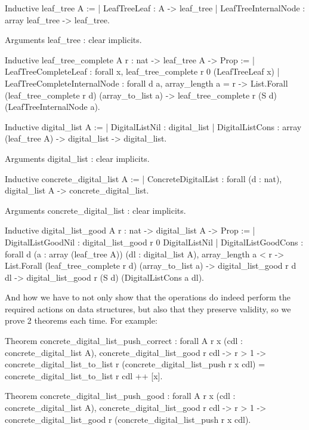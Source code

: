 \documentclass{article}
\begin{document}
\begin{coq}
Inductive leaf_tree {A} :=
  | LeafTreeLeaf : A -> leaf_tree
  | LeafTreeInternalNode : array leaf_tree -> leaf_tree.

Arguments leaf_tree : clear implicits.

Inductive leaf_tree_complete {A} r : nat -> leaf_tree A -> Prop :=
  | LeafTreeCompleteLeaf : forall x, leaf_tree_complete r 0 (LeafTreeLeaf x)
  | LeafTreeCompleteInternalNode :
      forall {d} a,
      array_length a = r ->
      List.Forall (leaf_tree_complete r d) (array_to_list a) ->
      leaf_tree_complete r (S d) (LeafTreeInternalNode a).
\end{coq}
\pagebreak%
\begin{coq}
Inductive digital_list {A} :=
  | DigitalListNil : digital_list
  | DigitalListCons : array (leaf_tree A) -> digital_list -> digital_list.

Arguments digital_list : clear implicits.

Inductive concrete_digital_list {A} :=
  | ConcreteDigitalList : forall (d : nat), digital_list A -> concrete_digital_list.

Arguments concrete_digital_list : clear implicits.

Inductive digital_list_good {A} r : nat -> digital_list A -> Prop :=
  | DigitalListGoodNil : digital_list_good r 0 DigitalListNil
  | DigitalListGoodCons :
      forall {d} (a : array (leaf_tree A)) (dl : digital_list A),
      array_length a < r ->
      List.Forall (leaf_tree_complete r d) (array_to_list a) ->
      digital_list_good r d dl ->
      digital_list_good r (S d) (DigitalListCons a dl).
\end{coq}

And how we have to not only show that the operations do indeed perform the required actions on data structures, but also that they preserve validity, so we prove 2 theorems each time. For example:

\begin{coq}
Theorem concrete_digital_list_push_correct :
  forall {A} r x (cdl : concrete_digital_list A),
  concrete_digital_list_good r cdl ->
  r > 1 ->
  concrete_digital_list_to_list r (concrete_digital_list_push r x cdl) =
    concrete_digital_list_to_list r cdl ++ [x].

Theorem concrete_digital_list_push_good :
  forall {A} r x (cdl : concrete_digital_list A),
  concrete_digital_list_good r cdl ->
  r > 1 ->
  concrete_digital_list_good r (concrete_digital_list_push r x cdl).
\end{coq}
\end{document}
